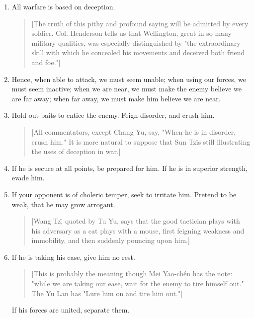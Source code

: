 \documentclass[10pt,a4paper]{book}
\begin{document}
\begin{enumerate}[leftmargin=*, label=\arabic*.,wide=0pt, resume]
\item All warfare is based on deception.

{\small
\begin{quote}
[The truth of this pithy and profound saying will be admitted by every soldier. Col. Henderson tells us that Wellington, great in so many military qualities, was especially distinguished by "the extraordinary skill with which he concealed his movements and deceived both friend and foe."]
\end{quote}
}

\item Hence, when able to attack, we must seem unable; when using our forces, we must seem inactive; when we are near, we must make the enemy believe we are far away; when far away, we must make him believe we are near.

\item Hold out baits to entice the enemy. Feign disorder, and crush him.

{\small
\begin{quote}
[All commentators, except Chang Yu, say, "When he is in disorder, crush him." It is more natural to suppose that Sun Tz\u is still illustrating the uses of deception in war.]
\end{quote}
}

\item If he is secure at all points, be prepared for him. If he is in superior strength, evade him.

\item If your opponent is of choleric temper, seek to irritate him. Pretend to be weak, that he may grow arrogant.

{\small
\begin{quote}
[Wang Tz\u, quoted by Tu Yu, says that the good tactician plays with his adversary as a cat plays with a mouse, first feigning weakness and immobility, and then suddenly pouncing upon him.]
\end{quote}
}

\item If he is taking his ease, give him no rest.

{\small
\begin{quote}
[This is probably the meaning though Mei Yao-ch\'en has the note: "while we are taking our ease, wait for the enemy to tire himself out." The Yu Lan has "Lure him on and tire him out."]
\end{quote}
}

If his forces are united, separate them.


\end{enumerate}
\end{document}
